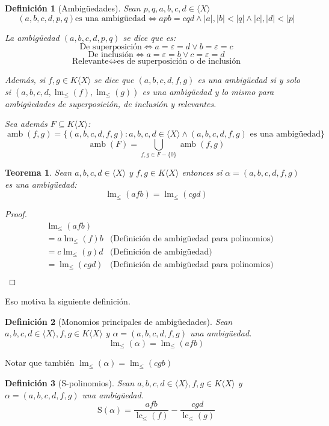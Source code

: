 \documentclass[fleqn]{amsbook} %
\theoremstyle{customstyle}
\newtheorem{definition}{Definición}[section]
\newtheorem{theorem}{Teorema}[section]
\DeclareMathOperator{\lm}{lm}
\DeclareMathOperator{\lc}{lc}
\DeclareMathOperator{\amb}{amb}
\renewcommand{\S}{\text{S}}
\begin{document}
\begin{definition}[Ambigüedades]
Sean $p, q, a, b, c, d ∈ ⟨X⟩$
\[ (a, b, c, d, p, q) \text{es una ambigüedad} ⇔ apb = cqd ∧ |a|, |b| < |q| ∧ |c|, |d| < |p| \]

La ambigüedad $(a, b, c, d, p, q)$ se dice que es:
\[ \text{De superposición} ⇔ a = ε = d ∨ b = ε = c \]
\[ \text{De inclusión} ⇔ a = ε = b ∨ c = ε = d \]
\[ \text{Relevante} ⇔ \text{es de superposición o de inclusión} \]

Además, si $f, g ∈ K⟨X⟩$ se dice que $(a, b, c, d, f, g)$ es una ambigüedad si y solo si $(a, b, c, d, \lm_≤{(f)}, \lm_≤{(g)})$ es una ambigüedad y lo mismo para ambigüedades de superposición, de inclusión y relevantes.

Sea además $F ⊆ K⟨X⟩$:
\[ \amb(f, g) = \{(a, b, c, d, f, g) : a, b, c, d ∈ ⟨X⟩ ∧ (a, b, c, d, f, g)\text{ es una ambigüedad}\} \]
\[ \amb(F) = ⋃_{f, g ∈ F - \{0\}}{\amb(f, g)} \]

\end{definition}

\begin{theorem}
Sean $a, b, c, d ∈ ⟨X⟩$ y $f, g ∈ K⟨X⟩$ entonces si $α = (a, b, c, d, f, g)$ es una ambigüedad:
\[ \lm_≤{(afb)} = \lm_≤{(cgd)} \]

\end{theorem}
\begin{proof}\
\begin{align*}
&\lm_≤{(afb)} &\\
& = a\lm_≤{(f)}b &\text{(Definición de ambigüedad para polinomios)} \\
& = c\lm_≤{(g)}d &\text{(Definición de ambigüedad)} \\
& = \lm_≤{(cgd)} &\text{(Definición de ambigüedad para polinomios)} \\
\end{align*}
\end{proof}

Eso motiva la siguiente definición.

\begin{definition}[Monomios principales de ambigüedades]
Sean $a, b, c, d ∈ ⟨X⟩, f, g ∈ K⟨X⟩$ y $α = (a, b, c, d, f, g)$ una ambigüedad.
\[ \lm_≤{(α)} = \lm_≤{(afb)} \]
\end{definition}

Notar que también $\lm_≤{(α)} = \lm_≤{(cgb)}$

\begin{definition}[S-polinomios]
Sean $a, b, c, d ∈ ⟨X⟩, f, g ∈ K⟨X⟩$ y $α = (a, b, c, d, f, g)$ una ambigüedad.
\[ \S(α) = \frac{afb}{\lc_≤{(f)}} - \frac{cgd}{\lc_≤{(g)}} \]
\end{definition}
\end{document}
